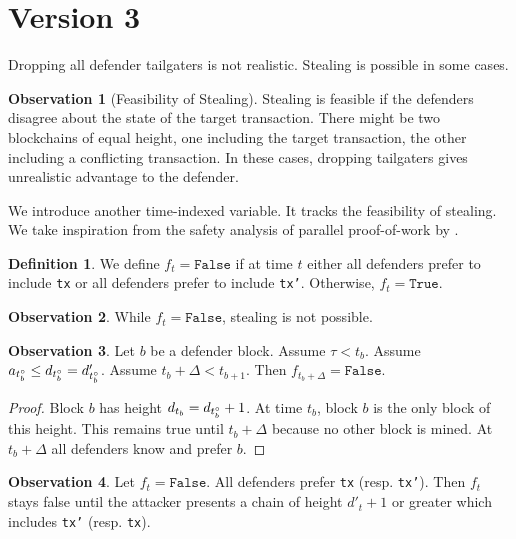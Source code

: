 \documentclass[12pt]{article}
\theoremstyle{definition}
\newtheorem{definition}{Definition}
\newtheorem{observation}{Observation}
\begin{document}
\section{Version 3} \label{sec:v3}

Dropping all defender tailgaters is not realistic. Stealing is possible in some cases.

\begin{observation}[Feasibility of Stealing]
  Stealing is feasible if the defenders disagree about the state of the target transaction.
  There might be two blockchains of equal height, one including the target transaction, the other including a conflicting transaction.
  In these cases, dropping tailgaters gives unrealistic advantage to the defender.
\end{observation}

We introduce another time-indexed variable.
It tracks the feasibility of stealing.
We take inspiration from the safety analysis of parallel proof-of-work by \citet{keller2022ParallelProofofwork}.

\begin{definition} \label{def:ts2}
  We define $f_t = \texttt{False}$ if at time $t$ either all defenders prefer to include \texttt{tx} or all defenders prefer to include \texttt{tx'}. Otherwise, $f_t = \texttt{True}$.
\end{definition}

\begin{observation}
  While $f_t = \texttt{False}$, stealing is not possible.
\end{observation}

\begin{observation}\label{obs:sync}
  Let $b$ be a defender block.
  Assume $\tau < t_b$.
  Assume $a_{t_b^{\circ}} \leq d_{t_b^{\circ}} = d'_{t_b^{\circ}}$.
  Assume $t_b + \Delta < t_{b+1}$.
  Then $f_{t_b + \Delta} = \texttt{False}$.

  \begin{proof}
    Block $b$ has height $d_{t_b} = d_{t_b^{\circ}} + 1$.
    At time $t_b$, block $b$ is the only block of this height.
    This remains true until $t_b + \Delta$ because no other block is mined.
    At $t_b + \Delta$ all defenders know and prefer $b$.
  \end{proof}
\end{observation}

\begin{observation}
  Let $f_t = \texttt{False}$. All defenders prefer \texttt{tx} (resp. \texttt{tx'}).
  Then $f_t$ stays false until the attacker presents a chain of height $d'_t + 1$ or greater which includes \texttt{tx'} (resp. \texttt{tx}).
\end{observation}
\end{document}
